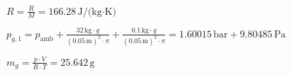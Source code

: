 \( R = \frac{R}{M} = 166.28 \, \text{J/(kg·K)} \)  

\( p_{g,1} = p_{\text{amb}} + \frac{32 \, \text{kg} \cdot g}{(0.05 \, \text{m})^2 \cdot \pi} + \frac{0.1 \, \text{kg} \cdot g}{(0.05 \, \text{m})^2 \cdot \pi} = 1.60015 \, \text{bar} + 9.80485 \, \text{Pa} \)  

\( m_g = \frac{p \cdot V}{R \cdot T} = 25.642 \, \text{g} \)